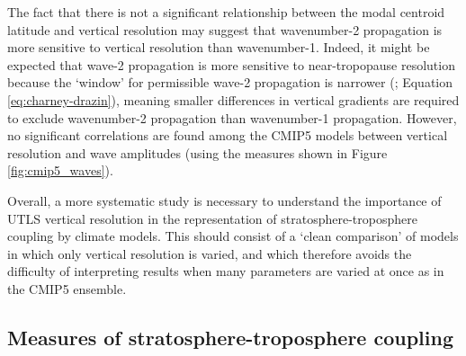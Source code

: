
The fact that there is not a significant relationship between the modal centroid
latitude and vertical resolution may suggest that wavenumber-2 propagation is
more sensitive to vertical resolution than wavenumber-1. Indeed, it might be
expected that wave-2 propagation is more sensitive to near-tropopause resolution
because the `window' for permissible wave-2 propagation is narrower
(\citet{Charney1961}; Equation \ref{eq:charney-drazin}), meaning smaller
differences in vertical gradients are required to exclude wavenumber-2
propagation than wavenumber-1 propagation. However, no significant correlations
are found among the CMIP5 models between vertical resolution and wave amplitudes
(using the measures shown in Figure \ref{fig:cmip5_waves}).

Overall, a more systematic study is necessary to understand the importance of
UTLS vertical resolution in the representation of stratosphere-troposphere
coupling by climate models. This should consist of a `clean comparison' of
models in which only vertical resolution is varied, and which therefore avoids
the difficulty of interpreting results when many parameters are varied at once
as in the CMIP5 ensemble.




\subsection{Measures of stratosphere-troposphere coupling}
\label{sec:meas-strat-trop}

